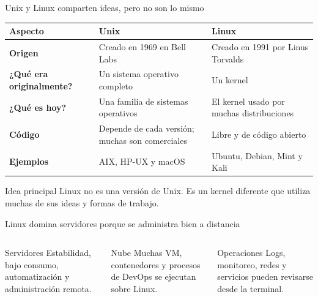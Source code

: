 \documentclass[aspectratio=169,10pt,c]{beamer}
\begin{document}
\begin{frame}{Unix y Linux comparten ideas, pero no son lo mismo}
\begin{center}
\small
\begin{tabular}{>{\bfseries}p{2.7cm}p{4.1cm}p{4.1cm}}
\toprule
Aspecto & Unix & Linux \\
\midrule
Origen & Creado en 1969 en Bell Labs & Creado en 1991 por Linus Torvalds \\
¿Qué era originalmente? & Un sistema operativo completo & Un kernel \\
¿Qué es hoy? & Una familia de sistemas operativos & El kernel usado por muchas distribuciones \\
Código & Depende de cada versión; muchas son comerciales & Libre y de código abierto \\
Ejemplos & AIX, HP-UX y macOS & Ubuntu, Debian, Mint y Kali \\
\bottomrule
\end{tabular}
\end{center}
\vspace{0.25cm}
\begin{alertblock}{Idea principal}
Linux no es una versión de Unix. Es un kernel diferente que utiliza muchas de sus ideas y formas de trabajo.
\end{alertblock}
\end{frame}

\begin{frame}{Linux domina servidores porque se administra bien a distancia}
\begin{columns}[T,onlytextwidth]
\begin{block}{Servidores}
\small Estabilidad, bajo consumo, automatización y administración remota.
\end{block}
\begin{block}{Nube}
\small Muchas VM, contenedores y procesos de DevOps se ejecutan sobre Linux.
\end{block}
\begin{block}{Operaciones}
\small Logs, monitoreo, redes y servicios pueden revisarse desde la terminal.
\end{block}
\end{columns}
\vspace{0.25cm}
\end{frame}
\end{document}
